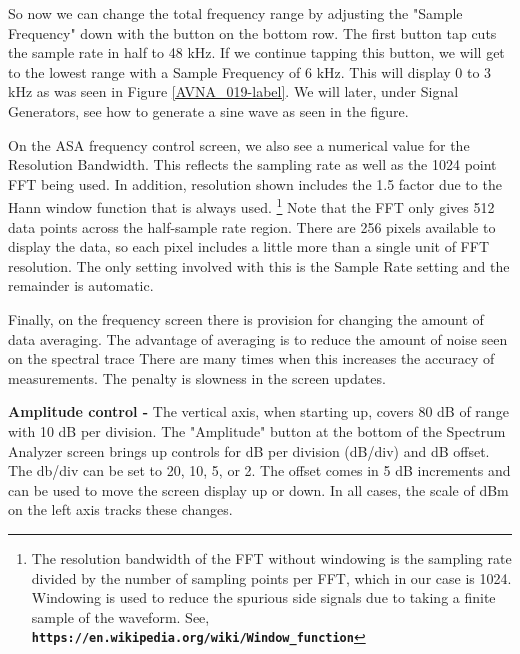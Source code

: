 So now we can change the total frequency range by adjusting the "Sample Frequency" down with the button on the bottom row.  The first button tap cuts the sample rate in half to 48 kHz.  If we continue tapping this button, we will get to the lowest range with a Sample Frequency of 6 kHz.  This will display 0 to 3 kHz as was seen in Figure  \ref{AVNA_019-label}.  We will later, under Signal Generators, see how to generate a sine wave as seen in the figure.


On the ASA frequency control screen,  we also see a numerical value for the Resolution Bandwidth.  This reflects the sampling rate as well as the 1024 point FFT being used.  In addition, resolution shown includes the 1.5 factor due to the Hann window function that is always used.
%
\footnote{The resolution bandwidth of the FFT without windowing is the sampling rate divided by the number of sampling points per FFT, which in our case is 1024.  Windowing is used to reduce the spurious side signals due to taking a finite sample of the waveform.  See, \linebreak \textbf{\texttt{https://en.wikipedia.org/wiki/Window\_function}}}
%
Note that the FFT only gives 512 data points across the half-sample rate region.  There are 256 pixels available to display the data, so each pixel includes a little more than a single unit of FFT resolution.    The only setting involved with this is the Sample Rate setting and the remainder is automatic.

Finally, on the frequency screen there is provision for changing the amount of data averaging.  The advantage of averaging is to reduce the amount of noise seen on the spectral trace  There are many times when this  increases the accuracy of measurements.  The penalty is slowness in the screen updates.

\textbf{Amplitude control - } The vertical axis, when starting up, covers 80 dB of range with 10 dB per division.  The "Amplitude" button at the bottom of the Spectrum Analyzer screen brings up controls for dB per division (dB/div) and dB offset.  The db/div can be set to 20, 10, 5, or 2.  The offset comes in 5 dB increments and can be used to move the screen display up or down.  In all cases, the scale of dBm on the left axis tracks these changes.


